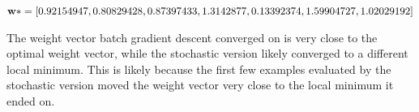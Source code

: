 \documentclass[12pt, fullpage,letterpaper]{article}
\begin{document}
\begin{enumerate}
\begin{enumerate}
		\bigskip
		
		${\bf w}* = [0.92154947, 0.80829428, 0.87397433, 1.3142877, 0.13392374, 1.59904727, 1.02029192]$
		
		The weight vector batch gradient descent converged on is very close to the optimal weight vector, while the stochastic version likely converged to a different local minimum. This is likely because the first few examples evaluated by the stochastic version moved the weight vector very close to the local minimum it ended on.
		
	\end{enumerate}

\end{enumerate}
\end{document}
